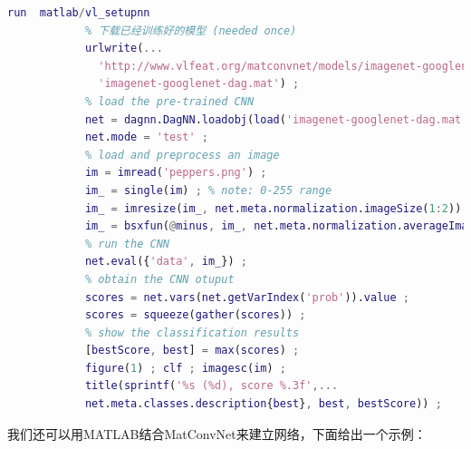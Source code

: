 \begin{lstlisting}[language = Matlab]
            run  matlab/vl_setupnn
            % 下载已经训练好的模型 (needed once)
            urlwrite(...
              'http://www.vlfeat.org/matconvnet/models/imagenet-googlenet-dag.mat', ...
              'imagenet-googlenet-dag.mat') ;
            % load the pre-trained CNN
            net = dagnn.DagNN.loadobj(load('imagenet-googlenet-dag.mat')) ;
            net.mode = 'test' ;
            % load and preprocess an image
            im = imread('peppers.png') ;
            im_ = single(im) ; % note: 0-255 range
            im_ = imresize(im_, net.meta.normalization.imageSize(1:2)) ;
            im_ = bsxfun(@minus, im_, net.meta.normalization.averageImage) ;
            % run the CNN
            net.eval({'data', im_}) ;
            % obtain the CNN otuput
            scores = net.vars(net.getVarIndex('prob')).value ;
            scores = squeeze(gather(scores)) ;
            % show the classification results
            [bestScore, best] = max(scores) ;
            figure(1) ; clf ; imagesc(im) ;
            title(sprintf('%s (%d), score %.3f',...
            net.meta.classes.description{best}, best, bestScore)) ;
            \end{lstlisting}
            \par
            我们还可以用MATLAB结合MatConvNet来建立网络，下面给出一个示例：
